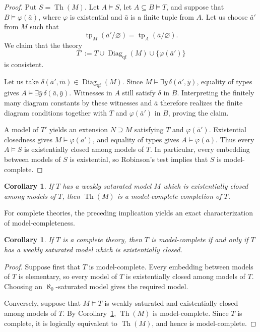 \documentclass[11pt,a4paper]{amsart}
\newtheorem{corollary}[theorem]{Corollary}
\theoremstyle{definition}
\DeclareMathOperator{\Th}{Th}
\begin{document}
\begin{proof}
Put $S=\Th(M)$. Let $A\models S$, let $A\subseteq B\models T$,
and suppose that $B\models\varphi(\bar a)$, where $\varphi$ is
existential and $\bar a$ is a finite tuple from $A$. Let us choose
$\bar a'$ from $M$ such that
\[
  \operatorname{tp}_M(\bar a'/\varnothing)
  =\operatorname{tp}_A(\bar a/\varnothing).
\]
We claim that the theory
\[
T':= T\cup\operatorname{Diag}_{\mathrm{qf}}(M)\cup\{\varphi(\bar a')\}
\]
is consistent.

Let us take 
$\delta(\bar a',\bar m)\in \operatorname{Diag}_{\mathrm{qf}}(M)$. Since
$M\models\exists\bar y\,\delta(\bar a',\bar y)$, equality of
types gives $A\models\exists\bar y\,\delta(\bar a,\bar y)$.
Witnesses in $A$ still satisfy $\delta$ in $B$. Interpreting the
finitely many diagram constants by these witnesses and $\bar a$
therefore realizes the finite diagram conditions together with
$T$ and $\varphi(\bar a')$ in $B$, proving the claim.

A model of $T'$ yields an extension $N\supseteq M$ satisfying
$T$ and $\varphi(\bar a')$. Existential closedness gives
$M\models\varphi(\bar a')$, and equality of types gives
$A\models\varphi(\bar a)$. Thus every $A\models S$ is
existentially closed among models of $T$. In particular, every
embedding between models of $S$ is existential, so Robinson's
test implies that $S$ is model-complete.
\end{proof}

\begin{corollary}\label{mc:cor:saturated-completion}
If $T$ has a weakly saturated model $M$ which is
existentially closed among models of $T$, then $\Th(M)$ is a
model-complete completion of $T$.
\end{corollary}

For complete theories, the preceding implication yields an exact
characterization of model-completeness.

\begin{corollary}\label{mc:cor:complete-case}
If $T$ is a complete theory, then $T$ is model-complete if and only if $T$ has a
weakly saturated model which is existentially closed.
\end{corollary}

\begin{proof}
Suppose first that $T$ is model-complete. Every embedding between
models of $T$ is elementary, so every model of $T$ is existentially
closed among models of $T$. Choosing an $\aleph_0$-saturated
model gives the required model.

Conversely, suppose that $M\models T$ is weakly saturated 
and existentially closed among models of $T$.
By Corollary~\ref{mc:cor:saturated-completion}, $\Th(M)$ is
model-complete. Since $T$ is complete, it is logically equivalent
to $\Th(M)$, and hence is model-complete.
\end{proof}
\end{document}
